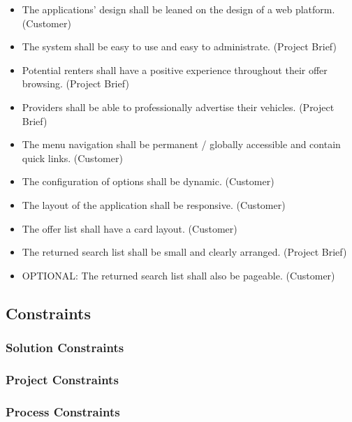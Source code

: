 \begin{itemize}
    \item The applications' design shall be leaned on the design of a web platform. (Customer)
    \item The system shall be easy to use and easy to administrate. (Project Brief)
    \item Potential renters shall have a positive experience throughout their offer browsing. (Project Brief)
    \item Providers shall be able to professionally advertise their vehicles. (Project Brief)
    \item The menu navigation shall be permanent / globally accessible and contain quick links. (Customer)
    \item The configuration of options shall be dynamic. (Customer)
    \item The layout of the application shall be responsive. (Customer)
    \item The offer list shall have a card layout. (Customer)
    \item The returned search list shall be small and clearly arranged. (Project Brief)
    \item OPTIONAL: The returned search list shall also be pageable. (Customer)
\end{itemize}


\subsection{Constraints}
\subsubsection{Solution Constraints}
\subsubsection{Project Constraints}
\subsubsection{Process Constraints}